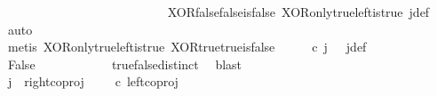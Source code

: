 \begin{isabellebody}
\ \ \ \ \ \ \ \ \isamarkupfalse%
\ \isamarkupfalse%
\ {\isachardoublequoteopen}{\isasymlangle}{\isasymt}{\isacharcomma}{\kern0pt}\ {\isasymt}{\isasymrangle}\ {\isacharequal}{\kern0pt}\ {\isasymlangle}{\isasymf}{\isacharcomma}{\kern0pt}{\isasymf}{\isasymrangle}{\isachardoublequoteclose}\isanewline
\ \ \ \ \ \ \ \ \ \ \isamarkupfalse%
\ XOR{\isacharunderscore}{\kern0pt}false{\isacharunderscore}{\kern0pt}false{\isacharunderscore}{\kern0pt}is{\isacharunderscore}{\kern0pt}false\ XOR{\isacharunderscore}{\kern0pt}only{\isacharunderscore}{\kern0pt}true{\isacharunderscore}{\kern0pt}left{\isacharunderscore}{\kern0pt}is{\isacharunderscore}{\kern0pt}true\ j{\isacharunderscore}{\kern0pt}def\ \isamarkupfalse%
\ auto\isanewline
\ \ \ \ \ \ \ \ \isamarkupfalse%
\ \isamarkupfalse%
\ {\isachardoublequoteopen}{\isasymt}\ {\isacharequal}{\kern0pt}\ {\isasymf}{\isachardoublequoteclose}\isanewline
\ \ \ \ \ \ \ \ \ \ \isamarkupfalse%
\ {\isacharparenleft}{\kern0pt}metis\ XOR{\isacharunderscore}{\kern0pt}only{\isacharunderscore}{\kern0pt}true{\isacharunderscore}{\kern0pt}left{\isacharunderscore}{\kern0pt}is{\isacharunderscore}{\kern0pt}true\ XOR{\isacharunderscore}{\kern0pt}true{\isacharunderscore}{\kern0pt}true{\isacharunderscore}{\kern0pt}is{\isacharunderscore}{\kern0pt}false\ {\isacartoucheopen}{\isasymlangle}{\isasymt}{\isacharcomma}{\kern0pt}{\isasymt}{\isasymrangle}\ {\isasymamalg}\ {\isasymlangle}{\isasymf}{\isacharcomma}{\kern0pt}{\isasymf}{\isasymrangle}\ {\isasymamalg}\ {\isasymlangle}{\isasymf}{\isacharcomma}{\kern0pt}{\isasymt}{\isasymrangle}\ {\isasymcirc}\isactrlsub c\ j\ {\isacharequal}{\kern0pt}\ {\isasymlangle}{\isasymf}{\isacharcomma}{\kern0pt}{\isasymf}{\isasymrangle}{\isacartoucheclose}\ j{\isacharunderscore}{\kern0pt}def{\isacharparenright}{\kern0pt}\isanewline
\ \ \ \ \ \ \ \ \isamarkupfalse%
\ \isamarkupfalse%
\ False\isanewline
\ \ \ \ \ \ \ \ \ \ \isamarkupfalse%
\ true{\isacharunderscore}{\kern0pt}false{\isacharunderscore}{\kern0pt}distinct\ \isamarkupfalse%
\ blast\isanewline
\ \ \ \ \ \ \isamarkupfalse%
\isanewline
\ \ \ \ \isamarkupfalse%
\isanewline
\ \ \ \ \ \ \isamarkupfalse%
\ {\isachardoublequoteopen}j\ {\isasymnoteq}\ right{\isacharunderscore}{\kern0pt}coproj\ {\isasymone}\ {\isacharparenleft}{\kern0pt}{\isasymone}\ {\isasymCoprod}\ {\isasymone}{\isacharparenright}{\kern0pt}\ {\isasymcirc}\isactrlsub c\ left{\isacharunderscore}{\kern0pt}coproj\ {\isasymone}\ {\isasymone}{\isachardoublequoteclose}\isanewline

\end{isabellebody}
